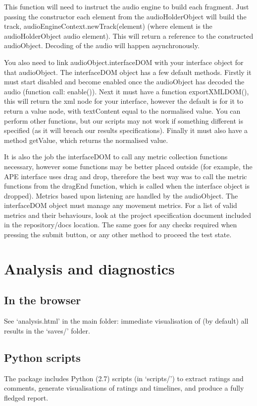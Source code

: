 \documentclass[11pt, oneside]{article}   	%
\begin{document}
			This function will need to instruct the audio engine to build each fragment. Just passing the constructor each element from the audioHolderObject will build the track, audioEngineContext.newTrack(element) (where element is the audioHolderObject audio element). This will return a reference to the constructed audioObject. Decoding of the audio will happen asynchronously.

			You also need to link audioObject.interfaceDOM with your interface object for that audioObject. The interfaceDOM object has a few default methods. Firstly it must start disabled and become enabled once the audioObject has decoded the audio (function call: enable()). Next it must have a function exportXMLDOM(), this will return the xml node for your interface, however the default is for it to return a value node, with textContent equal to the normalised value. You can perform other functions, but our scripts may not work if something different is specified (as it will breach our results specifications). Finally it must also have a method getValue, which returns the normalised value.

			It is also the job the interfaceDOM to call any metric collection functions necessary, however some functions may be better placed outside (for example, the APE interface uses drag and drop, therefore the best way was to call the metric functions from the dragEnd function, which is called when the interface object is dropped). Metrics based upon listening are handled by the audioObject. The interfaceDOM object must manage any movement metrics. For a list of valid metrics and their behaviours, look at the project specification document included in the repository/docs location. The same goes for any checks required when pressing the submit button, or any other method to proceed the test state.

\clearpage
\section{Analysis and diagnostics}
	\subsection{In the browser}
		See `analysis.html' in the main folder: immediate visualisation of (by default) all results in the `saves/' folder. 

	\subsection{Python scripts}
		The package includes Python (2.7) scripts (in `scripts/') to extract ratings and comments, generate visualisations of ratings and timelines, and produce a fully fledged report. 
\end{document}
